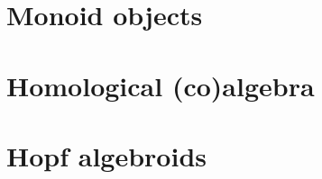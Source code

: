 \documentclass{amsart}
\theoremstyle{plain}
\theoremstyle{definition}
\newcommand{\0}{\mathbf{0}}
\renewcommand{\(}{\left(}
\renewcommand{\)}{\right)}
\newcommand{\1}{\mbf{1}}
\begin{document}


\section{Monoid objects}\label{appendix:monoid_objects}



\section{Homological (co)algebra}\label{appendix:coalgebra}



\section{Hopf algebroids}\label{appendix:hopf_algebroids}



%
%

\printbibliography
\end{document}
